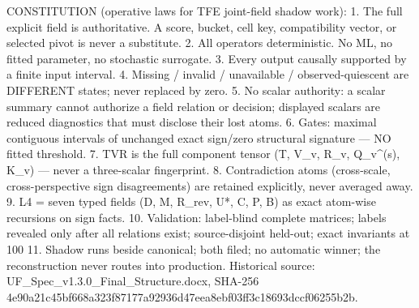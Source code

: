%

CONSTITUTION (operative laws for TFE joint-field shadow work):
1. The full explicit field is authoritative. A score, bucket, cell
   key, compatibility vector, or selected pivot is never a substitute.
2. All operators deterministic. No ML, no fitted parameter, no
   stochastic surrogate.
3. Every output causally supported by a finite input interval.
4. Missing / invalid / unavailable / observed-quiescent are DIFFERENT
   states; never replaced by zero.
5. No scalar authority: a scalar summary cannot authorize a field
   relation or decision; displayed scalars are reduced diagnostics
   that must disclose their lost atoms.
6. Gates: maximal contiguous intervals of unchanged exact sign/zero
   structural signature — NO fitted threshold.
7. TVR is the full component tensor (T, {V_v}, {R_v}, {Q_v^(s)},
   {K_v}) — never a three-scalar fingerprint.
8. Contradiction atoms (cross-scale, cross-perspective sign
   disagreements) are retained explicitly, never averaged away.
9. L4 = seven typed fields (D, M, R_rev, U*, C, P, B) as exact
   atom-wise recursions on sign facts.
10. Validation: label-blind complete matrices; labels revealed only
    after all relations exist; source-disjoint held-out; exact
    invariants at 100%
11. Shadow runs beside canonical; both filed; no automatic winner;
    the reconstruction never routes into production.
Historical source: UF_Spec_v1.3.0_Final_Structure.docx, SHA-256
4e90a21c45bf668a323f87177a92936d47eea8ebf03ff3c18693dccf06255b2b.

